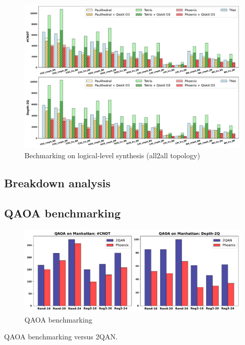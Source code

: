 \documentclass[conference]{IEEEtran}
\begin{document}
\begin{figure}[tbp]
    \centering
    \includegraphics[width=\columnwidth]{figures/all2all.pdf}
    \caption{Bechmarking on logical-level synthesis (all2all topology)}
    \label{fig:all2all}
\end{figure}


\subsection{Breakdown analysis}


\subsection{QAOA benchmarking}



\begin{figure}[tbp]
    \centering
    \includegraphics[width=\columnwidth]{figures/qaoa.pdf}
    \caption{QAOA benchmarking}
    \label{fig:qaoa}
\end{figure}



\begin{table}[btp]
    \centering
    \caption{QAOA benchmarking versus 2QAN.}
    \setlength{\tabcolsep}{3.8pt}
    \scalebox{0.78}{
        
    }
    \label{tab:qaoa}
\end{table}
\end{document}
